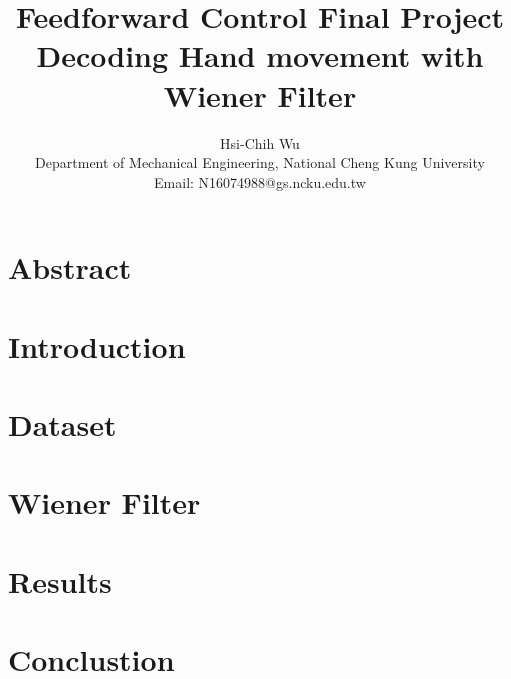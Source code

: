 \documentclass[8pt,a4paper]{article}
\begin{document}
\title{ \bf{ Feedforward Control Final Project \\  Decoding Hand movement with Wiener Filter }}
\author{ Hsi-Chih Wu \\ Department of Mechanical Engineering, National Cheng Kung University \\ Email: N16074988@gs.ncku.edu.tw  }
\date{}

\maketitle

\begin{multicols}{2}

\section*{Abstract}

\section{Introduction}

\section{Dataset}

\section{Wiener Filter}

\section{Results}

\section{Conclustion}

 \label{sec:references}
\newpage


\end{multicols}
\end{document}
